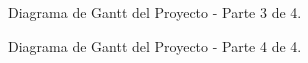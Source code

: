 \documentclass[
11pt, %
]{charter}
\begin{document}
\vspace{15px}

\begin{figure}[htpb]
\centering
{}
\caption{Diagrama de Gantt del Proyecto - Parte 3 de 4.}
\label{fig:diagBloques}
\end{figure}

\vspace{15px}

\begin{figure}[htpb]
\centering
{}
\caption{Diagrama de Gantt del Proyecto - Parte 4 de 4.}
\label{fig:diagBloques}
\end{figure}
\end{document}
